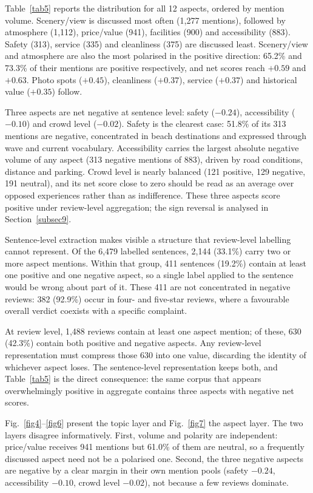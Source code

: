 \documentclass[pdflatex,sn-mathphys-num]{sn-jnl}
\begin{document}
Table~\ref{tab5} reports the distribution for all 12 aspects, ordered by mention volume. Scenery/view is discussed most often (1,277 mentions), followed by atmosphere (1,112), price/value (941), facilities (900) and accessibility (883). Safety (313), service (335) and cleanliness (375) are discussed least. Scenery/view and atmosphere are also the most polarised in the positive direction: 65.2\% and 73.3\% of their mentions are positive respectively, and net scores reach $+0.59$ and $+0.63$. Photo spots ($+0.45$), cleanliness ($+0.37$), service ($+0.37$) and historical value ($+0.35$) follow.

Three aspects are net negative at sentence level: safety ($-0.24$), accessibility ($-0.10$) and crowd level ($-0.02$). Safety is the clearest case: 51.8\% of its 313 mentions are negative, concentrated in beach destinations and expressed through wave and current vocabulary. Accessibility carries the largest absolute negative volume of any aspect (313 negative mentions of 883), driven by road conditions, distance and parking. Crowd level is nearly balanced (121 positive, 129 negative, 191 neutral), and its net score close to zero should be read as an average over opposed experiences rather than as indifference. These three aspects score positive under review-level aggregation; the sign reversal is analysed in Section~\ref{subsec9}.

Sentence-level extraction makes visible a structure that review-level labelling cannot represent. Of the 6,479 labelled sentences, 2,144 (33.1\%) carry two or more aspect mentions. Within that group, 411 sentences (19.2\%) contain at least one positive and one negative aspect, so a single label applied to the sentence would be wrong about part of it. These 411 are not concentrated in negative reviews: 382 (92.9\%) occur in four- and five-star reviews, where a favourable overall verdict coexists with a specific complaint.

At review level, 1,488 reviews contain at least one aspect mention; of these, 630 (42.3\%) contain both positive and negative aspects. Any review-level representation must compress those 630 into one value, discarding the identity of whichever aspect loses. The sentence-level representation keeps both, and Table~\ref{tab5} is the direct consequence: the same corpus that appears overwhelmingly positive in aggregate contains three aspects with negative net scores.

Fig.~\ref{fig4}--\ref{fig6} present the topic layer and Fig.~\ref{fig7} the aspect layer. The two layers disagree informatively. First, volume and polarity are independent: price/value receives 941 mentions but 61.0\% of them are neutral, so a frequently discussed aspect need not be a polarised one. Second, the three negative aspects are negative by a clear margin in their own mention pools (safety $-0.24$, accessibility $-0.10$, crowd level $-0.02$), not because a few reviews dominate.
\end{document}
